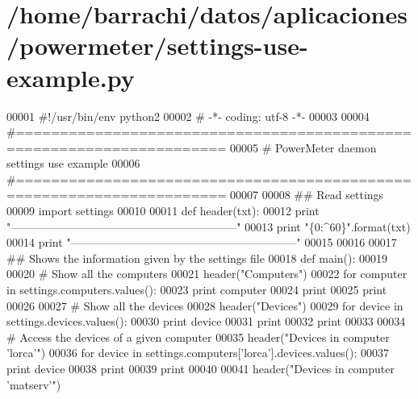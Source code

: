 \hypertarget{settings-use-example_8py_source}{\section{/home/barrachi/datos/aplicaciones/powermeter/settings-\/use-\/example.py}
}

\begin{DoxyCode}
00001 \textcolor{comment}{#!/usr/bin/env python2}
00002 \textcolor{comment}{# -*- coding: utf-8 -*-}
00003 
00004 \textcolor{comment}{#======================================================================}
00005 \textcolor{comment}{# PowerMeter daemon settings use example}
00006 \textcolor{comment}{#======================================================================}
00007 
00008 \textcolor{comment}{## Read settings}
00009 \textcolor{keyword}{import} settings
00010 
00011 \textcolor{keyword}{def }header(txt):
00012     \textcolor{keywordflow}{print} \textcolor{stringliteral}{"------------------------------------------------------------"}
00013     \textcolor{keywordflow}{print} \textcolor{stringliteral}{"\{0:^60\}"}.format(txt)
00014     \textcolor{keywordflow}{print} \textcolor{stringliteral}{"------------------------------------------------------------"}
00015     
00016 
00017 \textcolor{comment}{## Shows the information given by the settings file}
00018 \textcolor{keyword}{def }main():
00019 
00020     \textcolor{comment}{# Show all the computers}
00021     header(\textcolor{stringliteral}{"Computers"})
00022     \textcolor{keywordflow}{for} computer \textcolor{keywordflow}{in} settings.computers.values():
00023         \textcolor{keywordflow}{print} computer
00024     \textcolor{keywordflow}{print}
00025     \textcolor{keywordflow}{print}
00026 
00027     \textcolor{comment}{# Show all the devices}
00028     header(\textcolor{stringliteral}{"Devices"})
00029     \textcolor{keywordflow}{for} device \textcolor{keywordflow}{in} settings.devices.values():
00030         \textcolor{keywordflow}{print} device
00031     \textcolor{keywordflow}{print}
00032     \textcolor{keywordflow}{print}
00033     
00034     \textcolor{comment}{# Access the devices of a given computer}
00035     header(\textcolor{stringliteral}{"Devices in computer 'lorca'"})
00036     \textcolor{keywordflow}{for} device \textcolor{keywordflow}{in} settings.computers[\textcolor{stringliteral}{'lorca'}].devices.values():
00037         \textcolor{keywordflow}{print} device
00038     \textcolor{keywordflow}{print}
00039     \textcolor{keywordflow}{print}
00040 
00041     header(\textcolor{stringliteral}{"Devices in computer 'matserv'"})

\end{DoxyCode}
